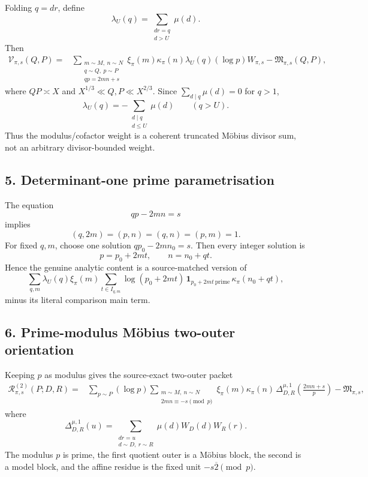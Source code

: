 Folding $q=dr$, define
\[
\lambda_U(q)=\sum_{\substack{dr=q\\d>U}}\mu(d).
\tag{V14.10}
\]
Then
\[
\boxed{\begin{aligned}
\mathcal V_{\pi,s}(Q,P)
={}&\sum_{\substack{m\sim M,\ n\sim N\\q\sim Q,\ p\sim P\\qp=2mn+s}}
\xi_\pi(m)\kappa_\pi(n)\lambda_U(q)(\log p)W_{\pi,s}
-\mathfrak M_{\pi,s}(Q,P),
\end{aligned}}
\tag{V14.11}
\]
where $QP\asymp X$ and $X^{1/3}\ll Q,P\ll X^{2/3}$.  Since
$\sum_{d\mid q}\mu(d)=0$ for $q>1$,
\[
\boxed{\lambda_U(q)=-\sum_{\substack{d\mid q\\d\le U}}\mu(d)\qquad(q>U).}
\tag{V14.12}
\]
Thus the modulus/cofactor weight is a coherent truncated M\"obius divisor sum, not an arbitrary divisor-bounded
weight.

\subsection*{5. Determinant-one prime parametrisation}
The equation
\[
qp-2mn=s
\tag{V14.13}
\]
implies
\[
(q,2m)=(p,n)=(q,n)=(p,m)=1.
\tag{V14.14}
\]
For fixed $q,m$, choose one solution $qp_0-2mn_0=s$.  Then every integer solution is
\[
\boxed{p=p_0+2mt,\qquad n=n_0+qt.}
\tag{V14.15}
\]
Hence the genuine analytic content is a source-matched version of
\[
\boxed{
\sum_{q,m}\lambda_U(q)\xi_\pi(m)
\sum_{t\in I_{q,m}}
\log(p_0+2mt)\,\mathbf1_{p_0+2mt\ \mathrm{prime}}
\,\kappa_\pi(n_0+qt),}
\tag{V14.16}
\]
minus its literal comparison main term.

\subsection*{6. Prime-modulus M\"obius two-outer orientation}
Keeping $p$ as modulus gives the source-exact two-outer packet
\[
\boxed{\begin{aligned}
\mathcal R^{(2)}_{\pi,s}(P;D,R)
={}&\sum_{p\sim P}(\log p)
\sum_{\substack{m\sim M,\ n\sim N\\2mn\equiv-s\pmod p}}
\xi_\pi(m)\kappa_\pi(n)\,
\Delta^{\mu,1}_{D,R}\!\left(\frac{2mn+s}{p}\right)
-\mathfrak M_{\pi,s},
\end{aligned}}
\tag{V14.17}
\]
where
\[
\boxed{
\Delta^{\mu,1}_{D,R}(u)
=\sum_{\substack{dr=u\\d\sim D,\ r\sim R}}
\mu(d)W_D(d)W_R(r).}
\tag{V14.18}
\]
The modulus $p$ is prime, the first quotient outer is a M\"obius block, the second is a model block, and the
affine residue is the fixed unit $-s\overline2\pmod p$.


